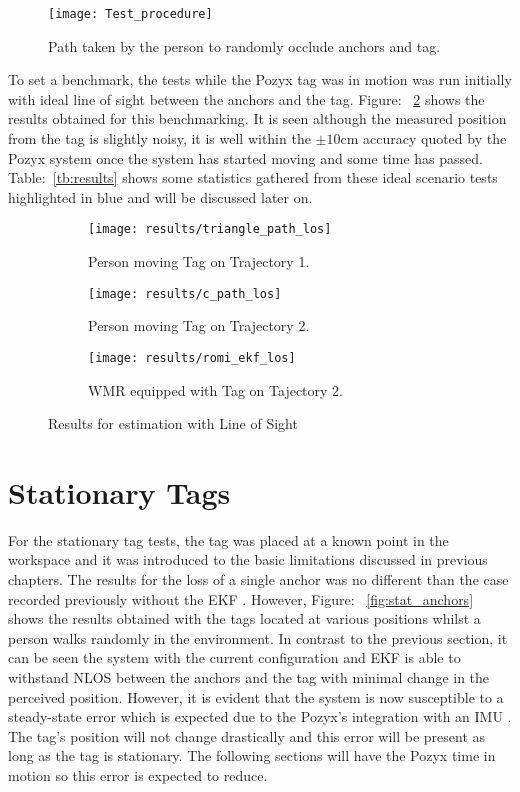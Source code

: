 \begin{figure}[ht!]
    \centering
    \texttt{[image: Test\_procedure]}
    \caption{Path taken by the person to randomly occlude anchors and tag.}
    \label{fig:occlude}
\end{figure}
To set a benchmark, the tests while the Pozyx tag was in motion was run initially with ideal line of sight between the anchors and the tag.
Figure: ~\ref{fig:los} shows the results obtained for this benchmarking.
It is seen although the measured position from the tag is slightly noisy, it is well within the $\pm10$cm accuracy quoted by the Pozyx system once the system has started moving and some time has passed.
Table:~\ref{tb:results} shows some statistics gathered from these ideal scenario tests highlighted in blue and will be discussed later on.

\begin{figure}[h!]
    \centering
    \begin{subfigure}{0.49\textwidth}
            \texttt{[image: results/triangle\_path\_los]}
            \caption{Person moving Tag on Trajectory 1.}
    \end{subfigure}
    \begin{subfigure}{0.49\textwidth}
            \texttt{[image: results/c\_path\_los]}
            \caption{Person moving Tag on Trajectory 2.}
    \end{subfigure}
    \begin{subfigure}{0.5\textwidth}
            \texttt{[image: results/romi\_ekf\_los]}
            \caption{WMR equipped with Tag on Tajectory 2.}
    \end{subfigure}
    \caption{Results for estimation with Line of Sight}
    \label{fig:los}
\end{figure}
\newpage
\section{Stationary Tags}\label{sec:stationary-tags}
For the stationary tag tests, the tag was placed at a known point in the workspace and it was introduced to the basic limitations discussed in previous chapters.
The results for the loss of a single anchor was no different than the case recorded previously without the EKF .
However, Figure: ~\ref{fig:stat_anchors} shows the results obtained with the tags located at various positions whilst a person walks randomly in the environment.
In contrast to the previous section, it can be seen the system with the current configuration and EKF is able to withstand NLOS between the anchors and the tag with minimal change in the perceived position.
However, it is evident that the system is now susceptible to a steady-state error which is expected due to the Pozyx's integration with an IMU .
The tag's position will not change drastically and this error will be present as long as the tag is stationary.
The following sections will have the Pozyx time in motion so this error is expected to reduce.

